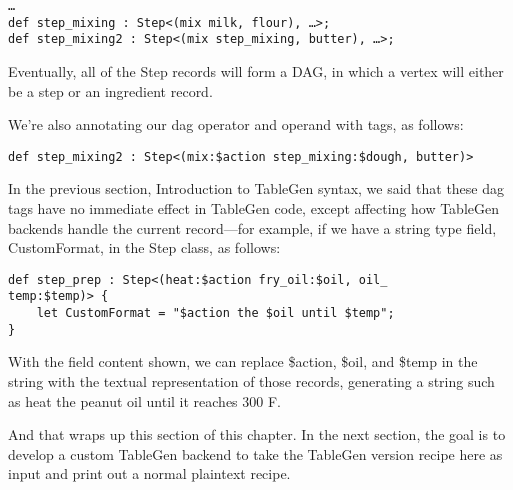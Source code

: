 \begin{enumerate}
\begin{lstlisting}[style=styleCXX]
…
def step_mixing : Step<(mix milk, flour), …>;
def step_mixing2 : Step<(mix step_mixing, butter), …>;
\end{lstlisting}

Eventually, all of the Step records will form a DAG, in which a vertex will either be a step or an ingredient record.

We're also annotating our dag operator and operand with tags, as follows:

\begin{lstlisting}[style=styleCXX]
def step_mixing2 : Step<(mix:$action step_mixing:$dough, butter)>
\end{lstlisting}

In the previous section, Introduction to TableGen syntax, we said that these dag tags have no immediate effect in TableGen code, except affecting how TableGen backends handle the current record—for example, if we have a string type field, CustomFormat, in the Step class, as follows:

\begin{lstlisting}[style=styleCXX]
def step_prep : Step<(heat:$action fry_oil:$oil, oil_
temp:$temp)> {
	let CustomFormat = "$action the $oil until $temp";
}
\end{lstlisting}

With the field content shown, we can replace \$action, \$oil, and \$temp in the string with the textual representation of those records, generating a string such as heat the peanut oil until it reaches 300 F.

\end{enumerate}

And that wraps up this section of this chapter. In the next section, the goal is to develop a custom TableGen backend to take the TableGen version recipe here as input and print out a normal plaintext recipe.




















